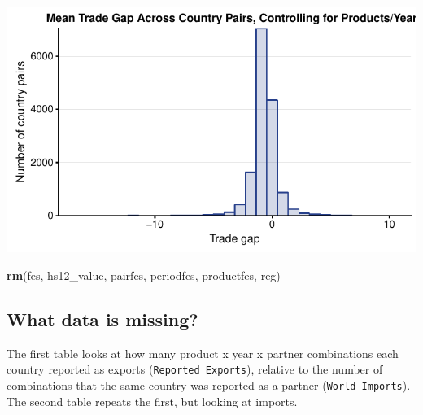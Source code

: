 \documentclass[10pt,]{article}
\newenvironment{Shaded}{\begin{snugshade}}{\end{snugshade}}
\newcommand{\KeywordTok}[1]{\textcolor[rgb]{0.13,0.29,0.53}{\textbf{{#1}}}}
\newcommand{\NormalTok}[1]{{#1}}
\begin{document}
\begin{center}\includegraphics{Figs/value_years_reg-3} \end{center}

\begin{Shaded}
\begin{Highlighting}[]
\KeywordTok{rm}\NormalTok{(fes, hs12_value, pairfes, periodfes, productfes, reg)}
\end{Highlighting}
\end{Shaded}

\subsection{What data is missing?}\label{what-data-is-missing}

The first table looks at how many product x year x partner combinations
each country reported as exports (\texttt{Reported\ Exports}), relative
to the number of combinations that the same country was reported as a
partner (\texttt{World\ Imports}). The second table repeats the first,
but looking at imports.
\end{document}
